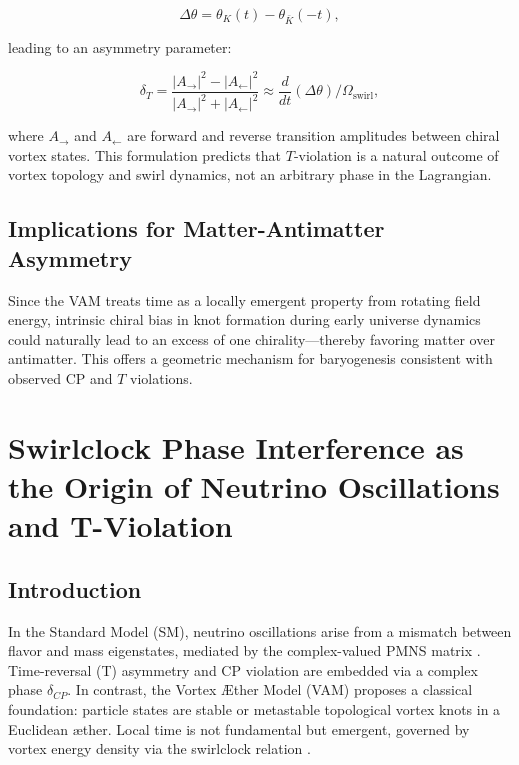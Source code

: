 \documentclass[preprint]{revtex4-2}
\begin{document}
\begin{equation}
\Delta \theta = \theta_K(t) - \theta_{\bar{K}}(-t),
\end{equation}

leading to an asymmetry parameter:

\begin{equation}
\delta_T = \frac{|A_{\rightarrow}|^2 - |A_{\leftarrow}|^2}{|A_{\rightarrow}|^2 + |A_{\leftarrow}|^2} \approx \frac{d}{dt} (\Delta \theta) \Big/ \Omega_{\text{swirl}},
\end{equation}

where $A_{\rightarrow}$ and $A_{\leftarrow}$ are forward and reverse transition amplitudes between chiral vortex states. This formulation predicts that $T$-violation is a natural outcome of vortex topology and swirl dynamics, not an arbitrary phase in the Lagrangian.

\subsection{Implications for Matter-Antimatter Asymmetry}

Since the VAM treats time as a locally emergent property from rotating field energy, intrinsic chiral bias in knot formation during early universe dynamics could naturally lead to an excess of one chirality—thereby favoring matter over antimatter. This offers a geometric mechanism for baryogenesis consistent with observed CP and $T$ violations.
\section{Swirlclock Phase Interference as the Origin of Neutrino Oscillations and T-Violation}

\subsection{Introduction}

In the Standard Model (SM), neutrino oscillations arise from a mismatch between flavor and mass eigenstates, mediated by the complex-valued PMNS matrix \cite{pontecorvo1957inverse, mns1962neutrino}. Time-reversal (T) asymmetry and CP violation are embedded via a complex phase \( \delta_{CP} \). In contrast, the Vortex \AE ther Model (VAM) proposes a classical foundation: particle states are stable or metastable topological vortex knots in a Euclidean \ae ther. Local time is not fundamental but emergent, governed by vortex energy density via the swirlclock relation \cite{iskandarani2025vam2}.
\end{document}
